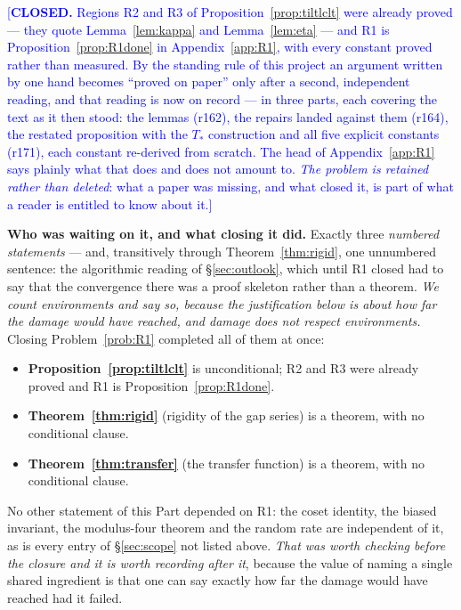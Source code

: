 \documentclass[11pt,a4paper]{article}
\theoremstyle{plain}
\theoremstyle{definition}
\theoremstyle{remark}
\newcommand{\STATUS}[1]{\textcolor{blue}{\textsf{[#1]}}}
\begin{document}
\STATUS{\textbf{CLOSED.} Regions \textup{R2} and \textup{R3} of
Proposition~\ref{prop:tiltlclt} were already proved --- they quote Lemma~\ref{lem:kappa} and
Lemma~\ref{lem:eta} --- and \textup{R1} is Proposition~\ref{prop:R1done} in
Appendix~\ref{app:R1}, with every constant proved rather than measured. By the standing rule of
this project an argument written by one hand becomes ``proved on paper'' only after a second,
independent reading, and that reading is now on record --- in three parts, each covering the
text as it then stood: the lemmas (r162), the repairs landed against them (r164), the restated
proposition with the $T_{*}$ construction and all five explicit constants (r171), each constant
re-derived from scratch. The head of Appendix~\ref{app:R1} says plainly what that does and does
not amount to. \emph{The problem is retained rather
than deleted}: what a paper was missing, and what closed it, is part of what a reader is
entitled to know about it.}

\noindent
\textbf{Who was waiting on it, and what closing it did.} Exactly three \emph{numbered
statements} --- and, transitively through Theorem~\ref{thm:rigid}, one unnumbered sentence: the
algorithmic reading of \S\ref{sec:outlook}, which until \textup{R1} closed had to say that the
convergence there was a proof skeleton rather than a theorem. \emph{We count environments and
say so, because the justification below is about how far the damage would have reached, and
damage does not respect environments.} Closing Problem~\ref{prob:R1} completed all of them at
once:

\begin{itemize}
\item \textbf{Proposition~\ref{prop:tiltlclt}} is unconditional; \textup{R2} and \textup{R3}
      were already proved and \textup{R1} is Proposition~\ref{prop:R1done}.
\item \textbf{Theorem~\ref{thm:rigid}} (rigidity of the gap series) is a theorem, with no
      conditional clause.
\item \textbf{Theorem~\ref{thm:transfer}} (the transfer function) is a theorem, with no
      conditional clause.
\end{itemize}

\noindent
No other statement of this Part depended on \textup{R1}: the coset identity, the biased
invariant, the modulus-four theorem and the random rate are independent of it, as is every
entry of \S\ref{sec:scope} not listed above. \emph{That was worth checking before the closure
and it is worth recording after it}, because the value of naming a single shared ingredient is
that one can say exactly how far the damage would have reached had it failed.
\end{document}
